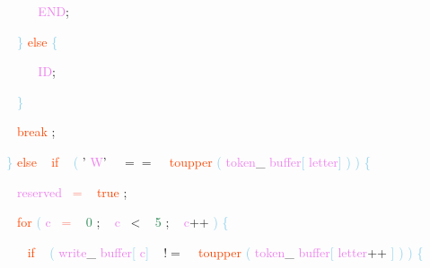 \documentclass[8, usernames, dvipsnames]{beamer}
\begin{document}
\begin{frame}
\textcolor{White}{\   }
\textcolor{White}{\   }
\textcolor{White}{\   }
\textcolor{White}{\   }
\textcolor{OrangeRed}{	}
\textcolor{White}{\ }
\textcolor{Violet}{END}\textcolor{Sepia}{;}

 \textcolor{White}{\   }
\textcolor{White}{\   }
\textcolor{White}{\   }
\textcolor{SkyBlue}{\} }
\textcolor{OrangeRed}{else}
\textcolor{SkyBlue}{\{ }

 \textcolor{White}{\   }
\textcolor{White}{\   }
\textcolor{White}{\   }
\textcolor{White}{\   }
\textcolor{OrangeRed}{	}
\textcolor{White}{\ }
\textcolor{Violet}{ID}\textcolor{Sepia}{;}

 \textcolor{White}{\   }
\textcolor{White}{\   }
\textcolor{White}{\   }
\textcolor{SkyBlue}{\} }

 \textcolor{White}{\   }
\textcolor{White}{\   }
\textcolor{White}{\   }
\textcolor{OrangeRed}{break}
\textcolor{Sepia}{;}

 \textcolor{White}{\   }
\textcolor{White}{\   }
\textcolor{SkyBlue}{\} }
\textcolor{OrangeRed}{else}
\textcolor{White}{\ }
\textcolor{OrangeRed}{if}
\textcolor{White}{\ }
\textcolor{SkyBlue}{(}
\textcolor{BurntOrange}{'}
\textcolor{Violet}{W}\textcolor{BurntOrange}{'}
\textcolor{White}{\ }
\textcolor{OliveGreen}{$==$}
\textcolor{White}{\ }
\textcolor{OrangeRed}{toupper}
\textcolor{SkyBlue}{(}
\textcolor{Violet}{token}\textcolor{Sepia}{\_}
\textcolor{Violet}{buffer}\textcolor{SkyBlue}{[}
\textcolor{Violet}{letter}\textcolor{SkyBlue}{]}
\textcolor{SkyBlue}{)}
\textcolor{SkyBlue}{)}
\textcolor{SkyBlue}{\{ }

 \textcolor{White}{\   }
\textcolor{White}{\   }
\textcolor{White}{\   }
\textcolor{Violet}{reserved}\textcolor{White}{\ }
\textcolor{Salmon}{=}
\textcolor{White}{\ }
\textcolor{OrangeRed}{true}
\textcolor{Sepia}{;}

 \textcolor{White}{\   }
\textcolor{White}{\   }
\textcolor{White}{\   }
\textcolor{OrangeRed}{for}
\textcolor{SkyBlue}{(}
\textcolor{Violet}{c}\textcolor{White}{\ }
\textcolor{Salmon}{=}
\textcolor{White}{\ }
\textcolor{SeaGreen}{0}
\textcolor{Sepia}{;}
\textcolor{White}{\ }
\textcolor{Violet}{c}\textcolor{White}{\ }
\textcolor{OliveGreen}{\textless}
\textcolor{White}{\ }
\textcolor{SeaGreen}{5}
\textcolor{Sepia}{;}
\textcolor{White}{\ }
\textcolor{Violet}{c}\textcolor{Apricot}{++}
\textcolor{SkyBlue}{)}
\textcolor{SkyBlue}{\{ }

 \textcolor{White}{\   }
\textcolor{White}{\   }
\textcolor{White}{\   }
\textcolor{White}{\   }
\textcolor{OrangeRed}{if}
\textcolor{White}{\ }
\textcolor{SkyBlue}{(}
\textcolor{Violet}{write}\textcolor{Sepia}{\_}
\textcolor{Violet}{buffer}\textcolor{SkyBlue}{[}
\textcolor{Violet}{c}\textcolor{SkyBlue}{]}
\textcolor{White}{\ }
\textcolor{OliveGreen}{$!=$}
\textcolor{White}{\ }
\textcolor{OrangeRed}{toupper}
\textcolor{SkyBlue}{(}
\textcolor{Violet}{token}\textcolor{Sepia}{\_}
\textcolor{Violet}{buffer}\textcolor{SkyBlue}{[}
\textcolor{Violet}{letter}\textcolor{Apricot}{++}
\textcolor{SkyBlue}{]}
\textcolor{SkyBlue}{)}
\textcolor{SkyBlue}{)}
\textcolor{SkyBlue}{\{ }


\end{frame}
\end{document}
